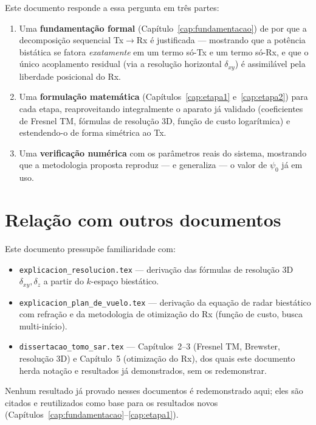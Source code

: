 \documentclass[12pt,a4paper,oneside]{book}
\theoremstyle{definition}
\theoremstyle{remark}
\newcommand{\dxy}{\delta_{xy}}
\newcommand{\dz}{\delta_z}
\begin{document}
\begin{center}
\end{center}

Este documento responde a essa pergunta em três partes:

\begin{enumerate}
  \item Uma \textbf{fundamentação formal} (Capítulo~\ref{cap:fundamentacao})
  de por que a decomposição sequencial Tx$\to$Rx é justificada — mostrando
  que a potência bistática se fatora \emph{exatamente} em um termo
  só-Tx e um termo só-Rx, e que o único acoplamento residual (via a
  resolução horizontal $\dxy$) é assimilável pela liberdade posicional do
  Rx.

  \item Uma \textbf{formulação matemática} (Capítulos~\ref{cap:etapa1}
  e~\ref{cap:etapa2}) para cada etapa, reaproveitando integralmente o
  aparato já validado (coeficientes de Fresnel TM, fórmulas de resolução
  3D, função de custo logarítmica) e estendendo-o de forma simétrica ao
  Tx.

  \item Uma \textbf{verificação numérica} com os parâmetros reais do
  sistema, mostrando que a metodologia proposta reproduz — e generaliza —
  o valor de $\psi_0$ já em uso.
\end{enumerate}

\section{Relação com outros documentos}

Este documento pressupõe familiaridade com:
\begin{itemize}
  \item \texttt{explicacion\_resolucion.tex} — derivação das fórmulas de
  resolução 3D $\dxy,\dz$ a partir do $k$-espaço biestático.
  \item \texttt{explicacion\_plan\_de\_vuelo.tex} — derivação da equação de
  radar biestático com refração e da metodologia de otimização do Rx
  (função de custo, busca multi-início).
  \item \texttt{dissertacao\_tomo\_sar.tex} — Capítulos~2--3 (Fresnel TM,
  Brewster, resolução 3D) e Capítulo~5 (otimização do Rx), dos quais este
  documento herda notação e resultados já demonstrados, sem os
  redemonstrar.
\end{itemize}
Nenhum resultado já provado nesses documentos é redemonstrado aqui; eles
são citados e reutilizados como base para os resultados novos
(Capítulos~\ref{cap:fundamentacao}--\ref{cap:etapa1}).
\end{document}
